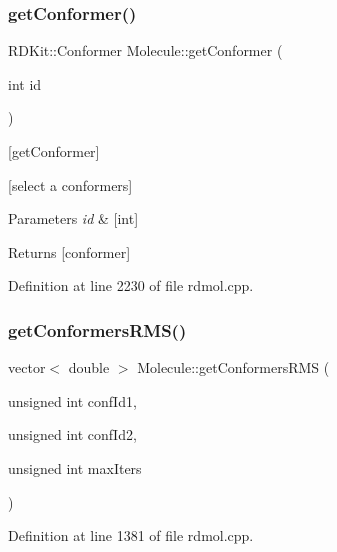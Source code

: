 \subsubsection{\texorpdfstring{get\+Conformer()}{getConformer()}}
{\footnotesize\ttfamily R\+D\+Kit\+::\+Conformer Molecule\+::get\+Conformer (\begin{DoxyParamCaption}\item[{int}]{id }\end{DoxyParamCaption})}



\mbox{[}get\+Conformer\mbox{]} 

\mbox{[}select a conformers\mbox{]}


\begin{DoxyParams}{Parameters}
{\em id} & \mbox{[}int\mbox{]} \\
\hline
\end{DoxyParams}
\begin{DoxyReturn}{Returns}
\mbox{[}conformer\mbox{]} 
\end{DoxyReturn}


Definition at line 2230 of file rdmol.\+cpp.

\mbox{\label{class_molecule_a98b0a89a7c6275eee5252155fa530e77}} 
\subsubsection{\texorpdfstring{get\+Conformers\+R\+M\+S()}{getConformersRMS()}}
{\footnotesize\ttfamily vector$<$ double $>$ Molecule\+::get\+Conformers\+R\+MS (\begin{DoxyParamCaption}\item[{unsigned int}]{conf\+Id1,  }\item[{unsigned int}]{conf\+Id2,  }\item[{unsigned int}]{max\+Iters }\end{DoxyParamCaption})}



Definition at line 1381 of file rdmol.\+cpp.

\mbox{\label{class_molecule_a89046a3437790e24581fd2958d49c544}} 
